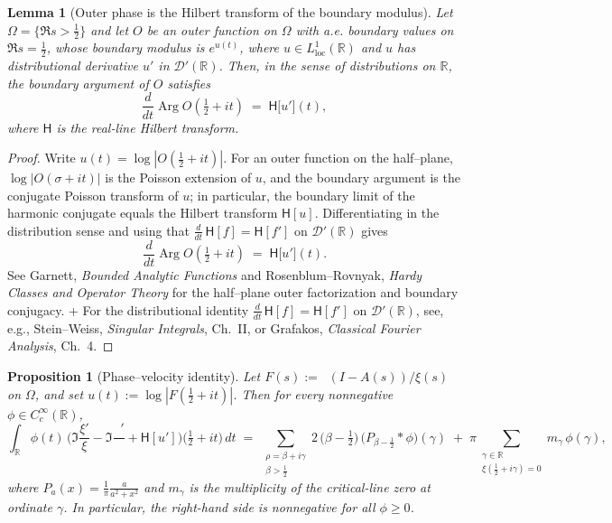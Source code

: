 \documentclass[11pt]{article}
\newtheorem{proposition}[theorem]{Proposition}
\newtheorem{lemma}[theorem]{Lemma}
\theoremstyle{definition}
\theoremstyle{remark}
\newcommand{\R}{\mathbb{R}}
\DeclareMathOperator{\dettwo}{det_2}
\DeclareMathOperator{\Arg}{Arg}
\begin{document}
\begin{lemma}[Outer phase is the Hilbert transform of the boundary modulus]\label{lem:outer-phase-HT}
Let \(\Omega=\{\Re s>\tfrac12\}\) and let \(O\) be an outer function on \(\Omega\) with a.e. boundary values on \(\Re s=\tfrac12\), whose boundary modulus is \(e^{u(t)}\), where \(u\in L^1_{\mathrm{loc}}(\R)\) and \(u\) has distributional derivative \(u'\) in \(\mathcal D'(\R)\). Then, in the sense of distributions on \(\R\), the boundary argument of \(O\) satisfies
\[
 \frac{d}{dt}\Arg O\!\left(\tfrac12+it\right)\;=\; \mathsf H\big[u'\big](t),
\]
where \(\mathsf H\) is the real-line Hilbert transform.
\end{lemma}
\begin{proof}
Write \(u(t)=\log|O(\tfrac12+it)|\). For an outer function on the half–plane, \(\log|O(\sigma+it)|\) is the Poisson extension of \(u\), and the boundary argument is the conjugate Poisson transform of \(u\); in particular, the boundary limit of the harmonic conjugate equals the Hilbert transform \(\mathsf H[u]\). Differentiating in the distribution sense and using that \(\tfrac{d}{dt}\,\mathsf H[f]=\mathsf H[f']\) on \(\mathcal D'(\R)\) gives
\[
 \frac{d}{dt}\Arg O\!\left(\tfrac12+it\right)\;=\; \mathsf H\big[u'\big](t).
\]
See Garnett, \emph{Bounded Analytic Functions} \cite[Ch.~II, §2 (Poisson integral), §5 (outer functions)]{Garnett} and Rosenblum–Rovnyak, \emph{Hardy Classes and Operator Theory} \cite[Ch.~2, §3]{RosenblumRovnyak} for the half–plane outer factorization and boundary conjugacy.
+ For the distributional identity $\tfrac{d}{dt}\,\mathsf H[f]=\mathsf H[f']$ on $\mathcal D'(\R)$, see, e.g., Stein–Weiss, \emph{Singular Integrals}, Ch.~II, or Grafakos, \emph{Classical Fourier Analysis}, Ch.~4.
\end{proof}
\begin{proposition}[Phase–velocity identity]\label{prop:phase-velocity-identity}
Let \(F(s):=\dettwo(I-A(s))/\xi(s)\) on \(\Omega\), and set \(u(t):=\log|F(\tfrac12+it)|\). Then for every nonnegative \(\phi\in C_c^\infty(\R)\),
\[
 \int_{\R}\!\phi(t)\,\Big(\Im\frac{\xi'}{\xi}-\Im\frac{\dettwo'}{\dettwo}+\mathsf H[u']\Big)\!\Big(\tfrac12+it\Big)\,dt
 \;=\; \sum_{\substack{\rho=\beta+i\gamma\\ \beta>\tfrac12}} 2\,\big(\beta-\tfrac12\big)\,\big(P_{\beta-\tfrac12}\!\ast\phi\big)(\gamma)
 \; +\; \pi\!\!\sum_{\substack{\gamma\in\R\\ \xi(\tfrac12+i\gamma)=0}} m_\gamma\,\phi(\gamma),
\]
where \(P_a(x)=\tfrac{1}{\pi}\tfrac{a}{a^2+x^2}\) and \(m_\gamma\) is the multiplicity of the critical-line zero at ordinate \(\gamma\). In particular, the right-hand side is nonnegative for all \(\phi\ge 0\).
\end{proposition}
\end{document}
